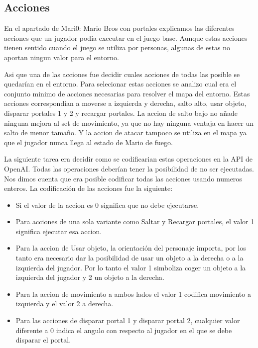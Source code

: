 \subsection{Acciones}

En el apartado de Mari0: Mario Bros con portales explicamos las diferentes acciones que un jugador podia executar en el juego base. Aunque estas acciones tienen sentido cuando el juego se utiliza por personas, algunas de estas no aportan ningun valor para el entorno. 

Asi que una de las acciones fue decidir cuales acciones de todas las posible se quedarían en el entorno. Para selecionar estas acciones se analizo cual era el conjunto minimo de acciones necesarias para resolver el mapa del entorno. Estas acciones correspondian a moverse a izquierda y derecha, salto alto, usar objeto, disparar portales 1 y 2 y recargar portales. La accion de salto bajo no añade ninguna mejora al set de movimiento, ya que no hay ninguna ventaja en hacer un salto de menor tamaño. Y la accion de atacar tampoco se utiliza en el mapa ya que el jugador nunca llega al estado de Mario de fuego.

La siguiente tarea era decidir como se codificarian estas operaciones en la API de OpenAI. Todas las operaciones deberían tener la posibilidad de no ser ejecutadas. Nos dimos cuenta que era posible codificar todas las acciones usando numeros enteros. La codificación de las acciones fue la siguiente:

\begin{itemize}
	\item Si el valor de la accion es 0 significa que no debe ejecutarse.
	\item Para acciones de una sola variante como Saltar y Recargar portales, el valor 1 significa ejecutar esa accion.
 	\item Para la accion de Usar objeto, la orientación del personaje importa, por los tanto era necesario dar la posibilidad de usar un objeto a la derecha o a la izquierda del jugador. Por lo tanto el valor 1 simboliza coger un objeto a la izquierda del jugador y 2 un objeto a la derecha.
	\item Para la accion de movimiento a ambos lados el valor 1 codifica movimiento a izquierda y el valor 2 a derecha.
	\item Para las acciones de disparar portal 1 y disparar portal 2, cualquier valor diferente a 0 indica el angulo con respecto al jugador en el que se debe disparar el portal.
\end{itemize}

